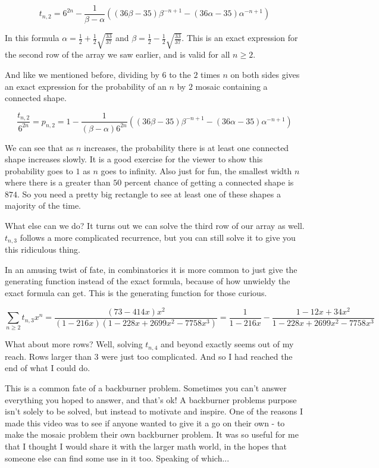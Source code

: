 \documentclass[12pt]{article}
\theoremstyle{plain}
\theoremstyle{definition}
\theoremstyle{remark}
\theoremstyle{definition}
\begin{document}
\begin{equation}
     t_{n,2}= 6^{2n} - \frac{1}{\beta-\alpha}((36\beta-35)\beta^{-n+1} - (36\alpha - 35)\alpha^{-n+1})
\end{equation}

In this formula $\alpha = \frac{1}{2} + \frac{1}{2}\sqrt{\frac{33}{37}}$ and $\beta = \frac{1}{2} - \frac{1}{2}\sqrt{\frac{33}{37}}$. This is an exact expression for the second row of the array we saw earlier, and is valid for all $n \geq 2$.

And like we mentioned before, dividing by $6$ to the $2$ times $n$ on both sides gives an exact expression for the probability of an $n$ by $2$ mosaic containing a connected shape. 

$$\frac{t_{n,2}}{6^{2n}} = p_{n,2} =  1 - \frac{1}{(\beta-\alpha)6^{2n}}((36\beta-35)\beta^{-n+1} - (36\alpha - 35)\alpha^{-n+1})$$

We can see that as $n$ increases, the probability there is at least one connected shape increases slowly. It is a good exercise for the viewer to show this probability goes to $1$ as $n$ goes to infinity. Also just for fun, the smallest width $n$ where there is a greater than $50$ percent chance of getting a connected shape is $874$. So you need a pretty big rectangle to see at least one of these shapes a majority of the time.

What else can we do? It turns out we can solve the third row of our array as well. $t_{n,3}$ follows a more complicated recurrence, but you can still solve it to give you this ridiculous thing. 

In an amusing twist of fate, in combinatorics it is more common to just give the generating function instead of the exact formula, because of how unwieldy the exact formula can get. This is the generating function for those curious.

\begin{equation}
    \sum_{n \geq 2}t_{n,3}x^n = \frac{(73-414x)x^2}{(1-216x)(1-228x+2699x^2-7758x^3)} = \frac{1}{1-216x} - \frac{1 -12x + 34x^2}{1-228x+2699x^2-7758x^3}
\end{equation}

What about more rows? Well, solving $t_{n,4}$ and beyond exactly seems out of my reach. Rows larger than $3$ were just too complicated. And so I had reached the end of what I could do.

This is a common fate of a backburner problem. Sometimes you can't answer everything you hoped to answer, and that's ok! A backburner problems purpose isn't solely to be solved, but instead to motivate and inspire. One of the reasons I made this video was to see if anyone wanted to give it a go on their own - to make the mosaic problem their own backburner problem. It was so useful for me that I thought I would share it with the larger math world, in the hopes that someone else can find some use in it too. Speaking of which...
\end{document}
